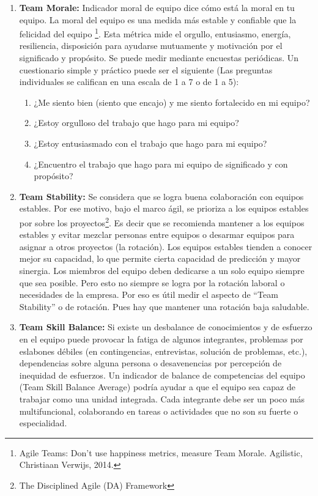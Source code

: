 \begin{enumerate}
\item {\textbf{Team Morale:} Indicador moral de equipo dice cómo está la moral en tu equipo. La moral del equipo es una medida más estable y confiable que la felicidad del equipo \footnote{Agile Teams: Don't use happiness metrics, measure Team Morale. Agilistic, Christiaan Verwijs, 2014.}. Esta métrica mide el orgullo, entusiasmo, energía, resiliencia, disposición para ayudarse mutuamente y motivación por el significado y propósito. Se puede medir mediante encuestas periódicas. Un cuestionario simple y práctico puede ser el siguiente (Las preguntas individuales se califican en una escala de 1 a 7 o de 1 a 5):
  \begin{enumerate}
  \item {¿Me siento bien (siento que encajo) y me siento fortalecido en mi equipo?}
  \item {¿Estoy orgulloso del trabajo que hago para mi equipo?}
  \item {¿Estoy entusiasmado con el trabajo que hago para mi equipo?}
  \item {¿Encuentro el trabajo que hago para mi equipo de significado y con propósito?}
  \end{enumerate}
}

\item {\textbf{Team Stability:} Se considera que se logra buena colaboración con equipos estables. Por ese motivo, bajo el marco ágil, se prioriza a los equipos estables por sobre los proyectos\footnote{The Disciplined Agile (DA) Framework}. Es decir que se recomienda mantener a los equipos estables y evitar mezclar personas entre equipos o desarmar equipos para asignar a otros proyectos (la rotación). Los equipos estables tienden a conocer mejor su capacidad, lo que permite cierta capacidad de predicción y mayor sinergia. Los miembros del equipo deben dedicarse a un solo equipo siempre que sea posible. Pero esto no siempre se logra por la rotación laboral o necesidades de la empresa. Por eso es útil medir el aspecto de “Team Stability” o  de rotación. Pues hay que mantener una rotación baja saludable.
}

\item {\textbf{Team Skill Balance:} Si existe un desbalance de conocimientos y de esfuerzo en el equipo puede provocar la fatiga de algunos integrantes, problemas por eslabones débiles (en contingencias, entrevistas, solución de problemas, etc.), dependencias sobre alguna persona o desavenencias por percepción de inequidad de esfuerzos. Un indicador de balance de competencias del equipo (Team Skill Balance Average) podría ayudar a que el equipo sea capaz de trabajar como una unidad integrada. Cada integrante debe ser un poco más multifuncional, colaborando en tareas o actividades que no son su fuerte o especialidad. 
}

\end{enumerate}

